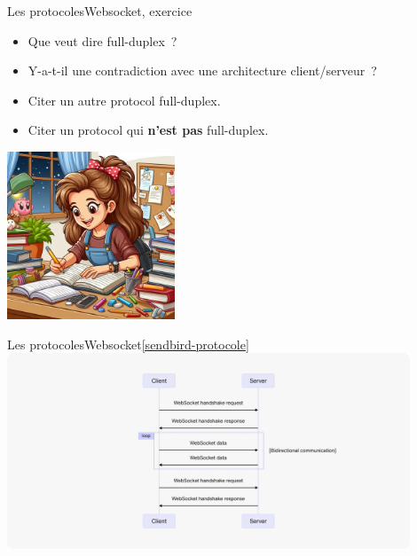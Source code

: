\documentclass{beamer}
\begin{document}
    \begin{frame}{Les protocoles}{Websocket, exercice \execcounterdispinc{}}
        \begin{itemize}
            \item Que veut dire full-duplex~?
            \item Y-a-t-il une contradiction avec une architecture client/serveur~?
            \item Citer un autre protocol full-duplex.
            \item Citer un protocol qui \textbf{n'est pas} full-duplex.
        \end{itemize}
        \bigbreak
        \centering
        \includegraphics[width=5cm]{image/homework}
    \end{frame}

    \begin{frame}{Les protocoles}{Websocket\cref{sendbird-protocole}}
        \centering
        \includegraphics[width=12cm]{image/tutorial-websocket-protocol-chart}
    \end{frame}
\end{document}
